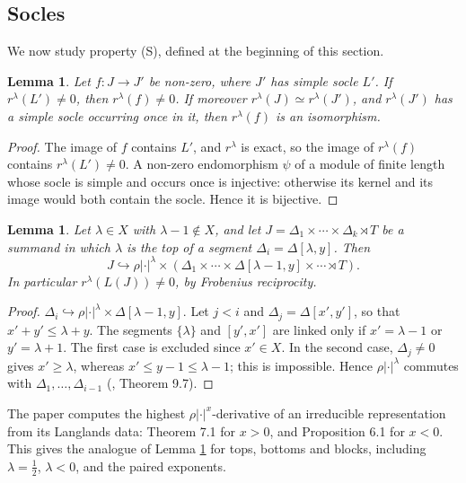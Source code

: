 \documentclass[a4paper,12pt,leqno]{amsart}
\theoremstyle{plain}
\newtheorem{lemma}[thm]{Lemma}
\theoremstyle{definition}
\begin{document}
\subsection{Socles}\label{ssec:socles}
We now study property (S), defined at the beginning of this section.

\begin{lemma}\label{lem:nonvanishing} Let $f:J\to J'$ be non-zero, where $J'$ has simple socle
$L'$. If $r^\lambda(L')\neq0$, then $r^\lambda(f)\neq0$. If moreover $r^\lambda(J)\simeq
r^\lambda(J')$, and $r^\lambda(J')$ has a simple socle occurring once in it, then $r^\lambda(f)$
is an isomorphism.
\end{lemma}

\begin{proof}
The image of $f$ contains $L'$, and $r^\lambda$ is exact, so the image of $r^\lambda(f)$
contains $r^\lambda(L')\neq0$. A non-zero endomorphism $\psi$ of a module of finite length whose
socle is simple and occurs once is injective: otherwise its kernel and its image would both contain
the socle. Hence it is bijective.
\end{proof}

\begin{lemma}\label{lem:embed} Let $\lambda\in X$ with $\lambda-1\notin X$, and let
$J=\Delta_1\times\cdots\times\Delta_k\rtimes T$ be a summand in which $\lambda$ is the top of a segment
$\Delta_i=\Delta[\lambda,y]$. Then
\[J\hookrightarrow\rho|\cdot|^\lambda\times(\Delta_1\times\cdots\times\Delta[\lambda-1,y]\times\cdots\rtimes T).\]
In particular $r^\lambda(L(J))\neq0$, by Frobenius
reciprocity.
\end{lemma}

\begin{proof}
$\Delta_i\hookrightarrow\rho|\cdot|^\lambda\times\Delta[\lambda-1,y]$. Let $j<i$ and
$\Delta_j=\Delta[x',y']$, so that $x'+y'\leq\lambda+y$. The segments $\{\lambda\}$ and $[y',x']$ are
linked only if $x'=\lambda-1$ or $y'=\lambda+1$. The first case is excluded since $x'\in X$. In the
second case, $\Delta_j\neq0$ gives $x'\geq\lambda$, whereas $x'\leq y-1\leq\lambda-1$; this is
impossible. Hence $\rho|\cdot|^\lambda$ commutes with $\Delta_1,\ldots,\Delta_{i-1}$ (\cite{Zel80},
Theorem 9.7).
\end{proof}

\noindent The paper \cite{AM23} computes the highest $\rho|\cdot|^x$-derivative of an irreducible
representation from its Langlands data: Theorem 7.1 for $x>0$, and Proposition 6.1 for $x<0$. This
gives the analogue of Lemma \ref{lem:embed} for tops, bottoms and blocks, including $\lambda=\tfrac12$,
$\lambda<0$, and the paired exponents.
\end{document}
